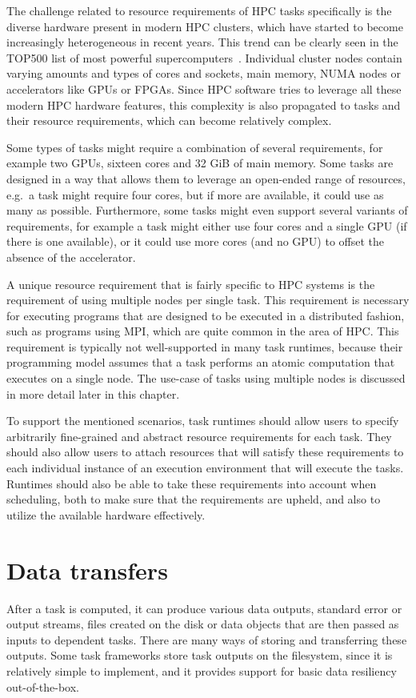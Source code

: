 The challenge related to resource requirements of HPC tasks specifically is the diverse hardware
present in modern HPC clusters, which have started to become increasingly heterogeneous in recent
years. This trend can be clearly seen in the TOP500 list of most powerful
supercomputers~\cite{top500analysis}. Individual cluster nodes contain varying amounts and
types of cores and sockets, main memory, NUMA nodes or accelerators like GPUs or FPGAs. Since HPC
software tries to leverage all these modern HPC hardware features, this complexity is also
propagated to tasks and their resource requirements, which can become relatively complex.

Some types of tasks might require a combination of several requirements, for example two GPUs,
sixteen cores and 32 GiB of main memory. Some tasks are designed in a way that allows them to
leverage an open-ended range of resources, e.g.\ a task might require four cores, but if more are
available, it could use as many as possible. Furthermore, some tasks might even support several
variants of requirements, for example a task might either use four cores and a single GPU (if there
is one available), or it could use more cores (and no GPU) to offset the absence of the
accelerator.

A unique resource requirement that is fairly specific to HPC systems is the requirement of using
multiple nodes per single task. This requirement is necessary for executing programs that are
designed to be executed in a distributed fashion, such as programs using MPI, which are quite
common in the area of HPC. This requirement is typically not well-supported in many task runtimes,
because their programming model assumes that a task performs an atomic computation that executes on
a single node. The use-case of tasks using multiple nodes is discussed in more detail later in this
chapter.

To support the mentioned scenarios, task runtimes should allow users to specify arbitrarily
fine-grained and abstract resource requirements for each task. They should also allow users to
attach resources that will satisfy these requirements to each individual instance of an execution
environment that will execute the tasks. Runtimes should also be able to take these requirements
into account when scheduling, both to make sure that the requirements are upheld, and also to
utilize the available hardware effectively.

\section{Data transfers}
After a task is computed, it can produce various data outputs, standard error or output streams,
files created on the disk or data objects that are then passed as inputs to dependent tasks. There
are many ways of storing and transferring these outputs. Some task frameworks store task outputs on
the filesystem, since it is relatively simple to implement, and it provides support for basic data
resiliency out-of-the-box.

